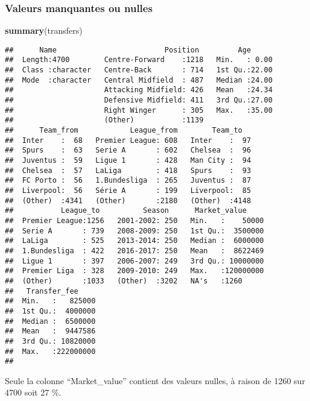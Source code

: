 \documentclass[]{article}
\newenvironment{Shaded}{\begin{snugshade}}{\end{snugshade}}
\newcommand{\KeywordTok}[1]{\textcolor[rgb]{0.13,0.29,0.53}{\textbf{#1}}}
\newcommand{\NormalTok}[1]{#1}
\begin{document}
\hypertarget{valeurs-manquantes-ou-nulles}{%
\subsubsection{Valeurs manquantes ou
nulles}\label{valeurs-manquantes-ou-nulles}}

\begin{Shaded}
\begin{Highlighting}[]
\KeywordTok{summary}\NormalTok{(transfers)}
\end{Highlighting}
\end{Shaded}

\begin{verbatim}
##      Name                         Position         Age       
##  Length:4700        Centre-Forward    :1218   Min.   : 0.00  
##  Class :character   Centre-Back       : 714   1st Qu.:22.00  
##  Mode  :character   Central Midfield  : 487   Median :24.00  
##                     Attacking Midfield: 426   Mean   :24.34  
##                     Defensive Midfield: 411   3rd Qu.:27.00  
##                     Right Winger      : 305   Max.   :35.00  
##                     (Other)           :1139                  
##      Team_from            League_from        Team_to    
##  Inter    :  68   Premier League: 608   Inter    :  97  
##  Spurs    :  63   Serie A       : 602   Chelsea  :  96  
##  Juventus :  59   Ligue 1       : 428   Man City :  94  
##  Chelsea  :  57   LaLiga        : 418   Spurs    :  93  
##  FC Porto :  56   1.Bundesliga  : 265   Juventus :  87  
##  Liverpool:  56   Série A       : 199   Liverpool:  85  
##  (Other)  :4341   (Other)       :2180   (Other)  :4148  
##           League_to          Season      Market_value      
##  Premier League:1256   2001-2002: 250   Min.   :    50000  
##  Serie A       : 739   2008-2009: 250   1st Qu.:  3500000  
##  LaLiga        : 525   2013-2014: 250   Median :  6000000  
##  1.Bundesliga  : 422   2016-2017: 250   Mean   :  8622469  
##  Ligue 1       : 397   2006-2007: 249   3rd Qu.: 10000000  
##  Premier Liga  : 328   2009-2010: 249   Max.   :120000000  
##  (Other)       :1033   (Other)  :3202   NA's   :1260       
##   Transfer_fee      
##  Min.   :   825000  
##  1st Qu.:  4000000  
##  Median :  6500000  
##  Mean   :  9447586  
##  3rd Qu.: 10820000  
##  Max.   :222000000  
## 
\end{verbatim}

Seule la colonne ``Market\_value'' contient des valeurs nulles, à raison
de 1260 sur 4700 soit 27 \%.
\end{document}

